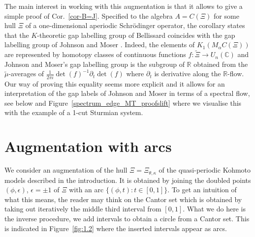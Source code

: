 \documentclass[11pt]{amsart}
\newcommand{\R}{\mathbb{R}}
\newcommand{\Z}{\mathbb{Z}}
\newcommand{\C}{\mathbb{C}}
\newcommand{\cut}{\kappa}
\begin{document}
The main interest in working with this augmentation is that it allows to give a simple proof of Cor.~\ref{cor-B=J}. Specified to the algebra $A=C(\Xi)$ for some hull $\Xi$ of a one-dimensional aperiodic Schr\"odinger operator, the corollary states that the $K$-theoretic gap labelling group of Bellissard coincides with the gap labelling group of Johnson and Moser \cite{johnson1982rotation,johnson1986exponential}. Indeed, the elements of $K_1(M_\alpha C(\Xi))$ are represented by homotopy classes of continuous functions $f:\tilde\Xi\to U_n(\C)$ and  
Johnson and Moser's gap labelling group is the subgroup of $\R$ obtained from the 
$\tilde\mu$-averages of $\frac1{2\pi i} \det(f)^{-1} \partial_t\det(f)$ where $\partial_t$ is derivative along the $\R$-flow.
Our way of proving this equality seems more explicit and it allows for an interpretation of the gap labels of Johnson and Moser in terms of a spectral flow, see below and Figure~\ref{spectrum_edge_MT_proofslift} where we visualise this with the example of a 1-cut Sturmian system. 



\section{Augmentation with arcs}
We consider an augmentation of the hull $\Xi = \Xi_{\theta,\cut}$ of the  quasi-periodic Kohmoto models described in the introduction.
 It is obtained by joining the doubled points $(\phi,\epsilon)$, $\epsilon = \pm 1$ of $\Xi$ with an arc $\{(\phi,t):t\in [0,1]\}$. To get an intuition of what this means, the reader may think on the Cantor set which is obtained by taking out iteratively the middle third interval from $[0,1]$. What we do here is the inverse procedure, we add intervals to obtain a circle from a Cantor set. 
This is indicated in Figure~\ref{fig:1.2} where the inserted intervals appear as arcs. 
\end{document}
